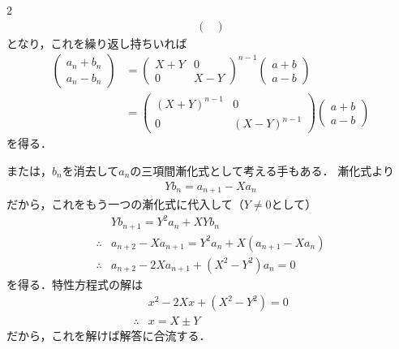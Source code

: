 \documentclass[../../main.tex]{subfiles}
\begin{document}
\begin{multicols}{2}
\begin{align}
\begin{pmatrix}
    \end{pmatrix}
  \end{align}
  となり，これを繰り返し持ちいれば
  \begin{align}
    \begin{pmatrix} a_{n}+b_{n} \\ a_{n}-b_{n}
    \end{pmatrix}
    & =
    \begin{pmatrix} X+Y & 0 \\ 0  & X-Y
    \end{pmatrix}^{n-1}
    \begin{pmatrix} a+b \\ a-b
    \end{pmatrix}           \\
    & =
    \begin{pmatrix} (X+Y)^{n-1} & 0 \\ 0  & (X-Y)^{n-1}
    \end{pmatrix}
    \begin{pmatrix} a+b \\ a-b
    \end{pmatrix}
  \end{align}
  を得る．

  または，$b_n$を消去して$a_n$の三項間漸化式として考える手もある．
  漸化式より
  \begin{align}
    Y b_n = a_{n+1} - Xa_n
  \end{align}
  だから，これをもう一つの漸化式に代入して（$Y\neq 0$として）
  \begin{align}
    & Yb_{n+1} = Y^2 a_n + XY b_n                                   \\
    \therefore
    & a_{n+2} - Xa_{n+1}  = Y^2 a_n + X\left(a_{n+1} - Xa_n \right) \\
    \therefore
    & a_{n+2} - 2X a_{n+1} + (X^2-Y^2) a_n = 0
  \end{align}
  を得る．特性方程式の解は
  \begin{align}
    & x^2 -2X x + (X^2-Y^2) = 0 \\
    \therefore
    & x = X \pm Y
  \end{align}
  だから，これを解けば解答に合流する．

  \newpage
\end{multicols}
\end{document}
